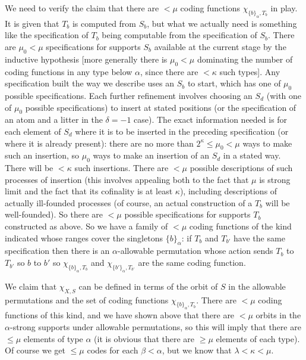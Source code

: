 \documentclass[112pt]{article}
\begin{document}
\begin{description}
We need to verify the claim that there are $<\mu$ coding functions $\chi_{\{b\}_\alpha,T_b}$ in play.  It is given that $T_b$ is computed from
$S_b$, but what we actually need is something like the specification of $T_b$ being computable from the specification of $S_b$.  There are $\mu_0<\mu$ specifications for supports $S_b$ available at the current stage by the inductive hypothesis [more generally there is $\mu_0<\mu$ dominating the number of coding functions in any type below $\alpha$, since there are $<\kappa$ such types].   Any specification built the way we describe uses
an $S_b$ to start, which has one of $\mu_0$ possible specifications.  Each further refinement involves choosing an $S_d$ (with one of $\mu_0$ possible specifications) to insert 
at stated positions (or the specification of an atom and a litter in the $\delta=-1$ case).  The exact information needed is for each element of $S_d$ where it is to be inserted in the preceding specification (or where it is already present):  there are no more than $2^\kappa\leq \mu_0<\mu$ ways to make such an insertion, so $\mu_0$ ways to make an insertion of an $S_d$ in a stated way. There will be $<\kappa$ such insertions.
There are $<\mu$ possible descriptions of such processes of insertion (this involves appealing both to the fact that $\mu$ is strong limit and the fact that its cofinality is at least $\kappa$), including descriptions of actually ill-founded processes (of course, an actual construction of a $T_b$ will be well-founded).  So there are $<\mu$ possible specifications for supports $T_b$ constructed as above.   So we have a family of $<\mu$ coding functions of the kind indicated whose ranges cover the singletons $\{b\}_\alpha$:  if $T_b$ and $T_{b'}$ have the same specification then there is an $\alpha$-allowable permutation whose action sends $T_b$ to $T_{b'}$ so $b$ to $b'$ so $\chi_{\{b\}_\alpha,T_b}$ and $\chi_{\{b'\}_\alpha,T_{b'}}$ are the same coding function.

We claim that $\chi_{X,S}$ can be defined in terms of the orbit of $S$ in the allowable permutations and the set of coding functions $\chi_{\{b\}_\alpha,T_b}$.  There are $<\mu$ coding functions of this kind, and we have shown above that there are $<\mu$ orbits in the $\alpha$-strong supports under allowable permutations, so this will imply that there are $\leq \mu$ elements of type $\alpha$ (it is obvious that there are $\geq \mu$ elements of each type).
Of course we get $\leq \mu$ codes for each $\beta<\alpha$, but we know that $\lambda<\kappa<\mu$.


\end{description}
\end{document}
